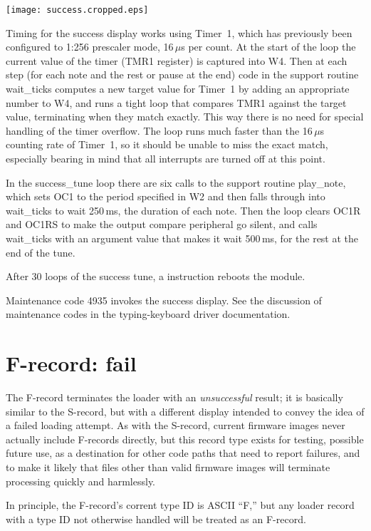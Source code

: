 \texttt{[image: success.cropped.eps]}

Timing for the success display works using Timer~1, which has previously
been configured to 1:256 prescaler mode, 16\,$\mu$s per count.  At the start
of the loop the current value of the timer (TMR1 register) is captured into
W4.  Then at each step (for each note and the rest or pause at the end) code
in the support routine wait\_ticks computes a new target value for Timer~1
by adding an appropriate number to W4, and runs a tight loop that compares
TMR1 against the target value, terminating when they match exactly.  This
way there is no need for special handling of the timer overflow.  The loop
runs much faster than the 16\,$\mu$s counting rate of Timer~1, so it should
be unable to miss the exact match, especially bearing in mind that all
interrupts are turned off at this point.

In the success\_tune loop there are six calls to the support routine
play\_note, which sets OC1 to the period specified in W2 and then falls
through into wait\_ticks to wait 250\,ms, the duration of each note.  Then
the loop clears OC1R and OC1RS to make the output compare peripheral go
silent, and calls wait\_ticks with an argument value that makes it wait
500\,ms, for the rest at the end of the tune.

After 30 loops of the success tune, a  instruction reboots the
module.

Maintenance code 4935 invokes the success display.  See the discussion of
maintenance codes in the typing-keyboard driver documentation.

\section{F-record: fail}

The F-record terminates the loader with an \emph{unsuccessful} result; it is
basically similar to the S-record, but with a different display intended to
convey the idea of a failed loading attempt.  As with the S-record, current
firmware images never actually include F-records directly, but this record
type exists for testing, possible future use, as a destination for other
code paths that need to report failures, and to make it likely that files
other than valid firmware images will terminate processing quickly and
harmlessly.

In principle, the F-record's corrent type ID is ASCII ``F,'' but any loader
record with a type ID not otherwise handled will be treated as an F-record.

